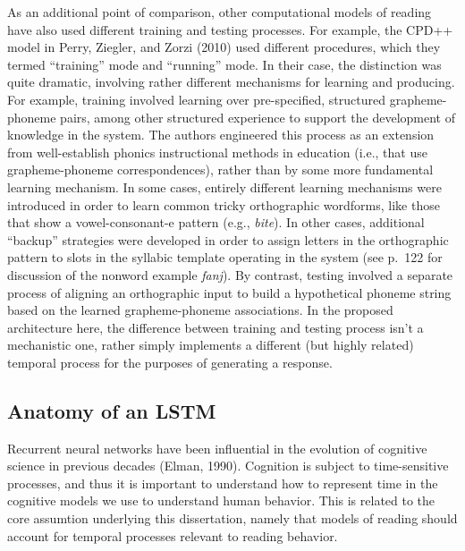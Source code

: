 \documentclass[
  american,
  man,floatsintext]{apa6}
\begin{document}
As an additional point of comparison, other computational models of reading have also used different training and testing processes. For example, the CPD++ model in Perry, Ziegler, and Zorzi (2010) used different procedures, which they termed ``training'' mode and ``running'' mode. In their case, the distinction was quite dramatic, involving rather different mechanisms for learning and producing. For example, training involved learning over pre-specified, structured grapheme-phoneme pairs, among other structured experience to support the development of knowledge in the system. The authors engineered this process as an extension from well-establish phonics instructional methods in education (i.e., that use grapheme-phoneme correspondences), rather than by some more fundamental learning mechanism. In some cases, entirely different learning mechanisms were introduced in order to learn common tricky orthographic wordforms, like those that show a vowel-consonant-e pattern (e.g., \emph{bite}). In other cases, additional ``backup'' strategies were developed in order to assign letters in the orthographic pattern to slots in the syllabic template operating in the system (see p.~122 for discussion of the nonword example \emph{fanj}). By contrast, testing involved a separate process of aligning an orthographic input to build a hypothetical phoneme string based on the learned grapheme-phoneme associations. In the proposed architecture here, the difference between training and testing process isn't a mechanistic one, rather simply implements a different (but highly related) temporal process for the purposes of generating a response.

\hypertarget{anatomy-of-an-lstm}{%
\subsection{Anatomy of an LSTM}\label{anatomy-of-an-lstm}}

Recurrent neural networks have been influential in the evolution of cognitive science in previous decades (Elman, 1990). Cognition is subject to time-sensitive processes, and thus it is important to understand how to represent time in the cognitive models we use to understand human behavior. This is related to the core assumtion underlying this dissertation, namely that models of reading should account for temporal processes relevant to reading behavior.
\end{document}
